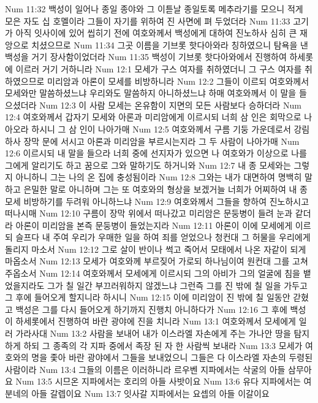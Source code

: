 Num 11:32  백성이 일어나 종일 종야와 그 이튿날 종일토록 메추라기를 모으니 적게 모은 자도 십 호멜이라 그들이 자기를 위하여 진 사면에 펴 두었더라
Num 11:33  고기가 아직 잇사이에 있어 씹히기 전에 여호와께서 백성에게 대하여 진노하사 심히 큰 재앙으로 치셨으므로
Num 11:34  그곳 이름을 기브롯 핫다아와라 칭하였으니 탐욕을 낸 백성을 거기 장사함이었더라
Num 11:35  백성이 기브롯 핫다아와에서 진행하여 하세롯에 이르러 거기 거하니라
Num 12:1  모세가 구스 여자를 취하였더니 그 구스 여자를 취하였으므로 미리암과 아론이 모세를 비방하니라
Num 12:2  그들이 이르되 여호와께서 모세와만 말씀하셨느냐 우리와도 말씀하지 아니하셨느냐 하매 여호와께서 이 말을 들으셨더라
Num 12:3  이 사람 모세는 온유함이 지면의 모든 사람보다 승하더라
Num 12:4  여호와께서 갑자기 모세와 아론과 미리암에게 이르시되 너희 삼 인은 회막으로 나아오라 하시니 그 삼 인이 나아가매
Num 12:5  여호와께서 구름 기둥 가운데로서 강림하사 장막 문에 서시고 아론과 미리암을 부르시는지라 그 두 사람이 나아가매
Num 12:6  이르시되 내 말을 들으라 너희 중에 선지자가 있으면 나 여호와가 이상으로 나를 그에게 알리기도 하고 꿈으로 그와 말하기도 하거니와
Num 12:7  내 종 모세와는 그렇지 아니하니 그는 나의 온 집에 충성됨이라
Num 12:8  그와는 내가 대면하여 명백히 말하고 은밀한 말로 아니하며 그는 또 여호와의 형상을 보겠거늘 너희가 어찌하여 내 종 모세 비방하기를 두려워 아니하느냐
Num 12:9  여호와께서 그들을 향하여 진노하시고 떠나시매
Num 12:10  구름이 장막 위에서 떠나갔고 미리암은 문둥병이 들려 눈과 같더라 아론이 미리암을 본즉 문둥병이 들었는지라
Num 12:11  아론이 이에 모세에게 이르되 슬프다 내 주여 우리가 우매한 일을 하여 죄를 얻었으나 청컨대 그 허물을 우리에게 돌리지 마소서
Num 12:12  그로 살이 반이나 썩고 죽어서 모태에서 나온 자같이 되게 마옵소서
Num 12:13  모세가 여호와께 부르짖어 가로되 하나님이여 원컨대 그를 고쳐 주옵소서
Num 12:14  여호와께서 모세에게 이르시되 그의 아비가 그의 얼굴에 침을 뱉었을지라도 그가 칠 일간 부끄러워하지 않겠느냐 그런즉 그를 진 밖에 칠 일을 가두고 그 후에 들어오게 할지니라 하시니
Num 12:15  이에 미리암이 진 밖에 칠 일동안 갇혔고 백성은 그를 다시 들어오게 하기까지 진행치 아니하다가
Num 12:16  그 후에 백성이 하세롯에서 진행하여 바란 광야에 진을 치니라
Num 13:1  여호와께서 모세에게 일러 가라사대
Num 13:2  사람을 보내어 내가 이스라엘 자손에게 주는 가나안 땅을 탐지하게 하되 그 종족의 각 지파 중에서 족장 된 자 한 사람씩 보내라
Num 13:3  모세가 여호와의 명을 좇아 바란 광야에서 그들을 보내었으니 그들은 다 이스라엘 자손의 두령된 사람이라
Num 13:4  그들의 이름은 이러하니라 르우벤 지파에서는 삭굴의 아들 삼무아요
Num 13:5  시므온 지파에서는 호리의 아들 사밧이요
Num 13:6  유다 지파에서는 여분네의 아들 갈렙이요
Num 13:7  잇사갈 지파에서는 요셉의 아들 이갈이요
